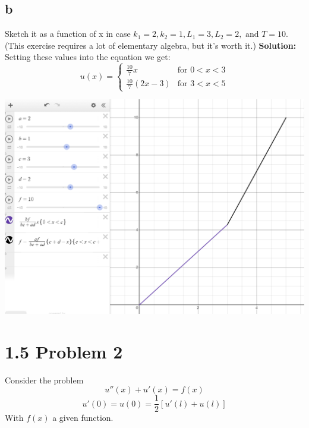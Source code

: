 \documentclass{article}
\begin{document}
\subsection*{b} Sketch it as a function of x in case $k_1 = 2, k_2 = 1, L_1 = 3, L_2 = 2, \text{ and } T = 10$. (This exercise requires a lot of elementary algebra, but
it's worth it.)
\textbf{Solution:}\\
Setting these values into the equation we get:
$$ u(x) = \begin{cases}
    \frac{10}{7}x & \text{for } 0 < x < 3\\
    \frac{10}{7}(2x-3) & \text{for } 3 < x < 5
\end{cases}$$

\begin{center}
    \includegraphics[scale=0.25]{IMGs/HW2plot.png}
\end{center}


\section*{1.5 Problem 2 }
Consider the problem 
$$ u''(x) + u'(x) = f(x)$$
$$ u'(0) = u(0) = \frac{1}{2}[u'(l) + u(l)]$$
With $f(x)$ a given function.\\
\end{document}
